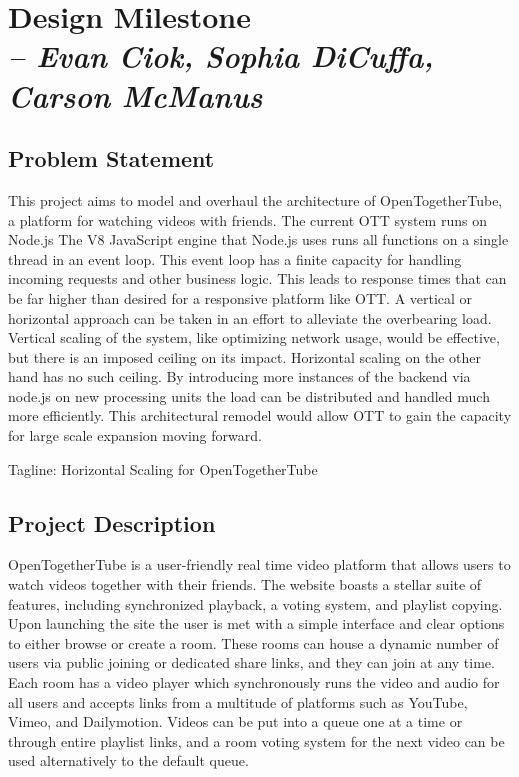\chapter{Design Milestone \\
  \small{\textit{-- Evan Ciok, Sophia DiCuffa, Carson McManus}}
  \label{Chapter::designMilestone}}

\section{Problem Statement}

This project aims to model and overhaul the architecture of OpenTogetherTube, a platform for watching videos with
friends. The current OTT system runs on Node.js The V8 JavaScript engine that Node.js uses runs all functions on
a single thread in an event loop. This event loop has a finite capacity for handling incoming requests and other
business logic. This leads to response times that can be far higher than desired for a responsive platform like OTT.
A vertical or horizontal approach can be taken in an effort to alleviate the overbearing load. Vertical scaling
of the system, like optimizing network usage, would be effective, but there is an imposed ceiling on its impact.
Horizontal scaling on the other hand has no such ceiling. By introducing more instances of the backend via
node.js on new processing units the load can be distributed and handled much more efficiently. This architectural
remodel would allow OTT to gain the capacity for large scale expansion moving forward.

Tagline: Horizontal Scaling for OpenTogetherTube

\section{Project Description}

OpenTogetherTube is a user-friendly real time video platform that allows users to watch videos together with their
friends. The website boasts a stellar suite of features, including synchronized playback, a voting system, and
playlist copying. Upon launching the site the user is met with a simple interface and clear options to either
browse or create a room. These rooms can house a dynamic number of users via public joining or dedicated share links,
and they can join at any time. Each room has a video player which synchronously runs the video and audio for all
users and accepts links from a multitude of platforms such as YouTube, Vimeo, and Dailymotion. Videos can be put
into a queue one at a time or through entire playlist links, and a room voting system for the next video can be used
alternatively to the default queue.

